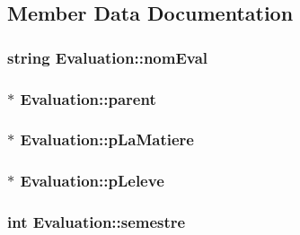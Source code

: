 \subsection{Member Data Documentation}
\hypertarget{class_evaluation_a3babca319a639a0f4811158cbbc47eb9}{
\subsubsection[{nom\+Eval}]{\setlength{\rightskip}{0pt plus 5cm}string Evaluation\+::nom\+Eval\hspace{0.3cm}{\ttfamily [private]}}}\label{class_evaluation_a3babca319a639a0f4811158cbbc47eb9}
\hypertarget{class_evaluation_a5d6336cee965270904fe3d91c6d484a1}{
\subsubsection[{parent}]{$\ast$ Evaluation\+::parent\hspace{0.3cm}{\ttfamily [private]}}}\label{class_evaluation_a5d6336cee965270904fe3d91c6d484a1}
\hypertarget{class_evaluation_ad5f4d301c80076389e2ea31dfd7f09b1}{
\subsubsection[{p\+La\+Matiere}]{$\ast$ Evaluation\+::p\+La\+Matiere\hspace{0.3cm}{\ttfamily [private]}}}\label{class_evaluation_ad5f4d301c80076389e2ea31dfd7f09b1}
\hypertarget{class_evaluation_a38afbf18ba9d4cd79055807d13c88c9f}{
\subsubsection[{p\+Leleve}]{$\ast$ Evaluation\+::p\+Leleve\hspace{0.3cm}{\ttfamily [private]}}}\label{class_evaluation_a38afbf18ba9d4cd79055807d13c88c9f}
\hypertarget{class_evaluation_ae000ec143562ed56975018bf82b13b5c}{
\subsubsection[{semestre}]{\setlength{\rightskip}{0pt plus 5cm}int Evaluation\+::semestre\hspace{0.3cm}{\ttfamily [private]}}}\label{class_evaluation_ae000ec143562ed56975018bf82b13b5c}
